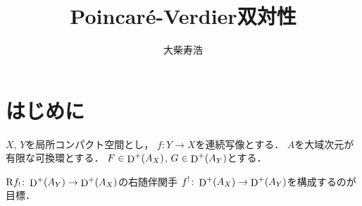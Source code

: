 \theoremstyle{mystyle}
\newtheorem{AXM}{公理}[section]
\newtheorem{DFN}[Axiom]{定義}
\newtheorem{THM}[Axiom]{定理}
\newtheorem*{THM*}{定理}
\newtheorem{PRP}[Axiom]{命題}
\newtheorem{LMM}[Axiom]{補題}
\newtheorem{CRL}[Axiom]{系}
\newtheorem{EG}[Axiom]{例}
\newtheorem{CNV}[Axiom]{規約}
\newtheorem{CMT}[Axiom]{コメント}









\def\inner<#1>{\langle #1 \rangle}








\title{Poincar\'e-Verdier双対性}
\author{大柴寿浩
}
\date{}

\maketitle
\section*{はじめに}
\(X\), \(Y\)を局所コンパクト空間とし，
\(f\colon{Y}\to{X}\)を連続写像とする．
\(A\)を大域次元が有限な可換環とする．
\(F\in\mathop{\mathrm{D}}\nolimits^+(A_X)\), \(G\in\mathop{\mathrm{D}}\nolimits^+(A_Y)\)とする．

\(\mathrm{R}f_!\colon\mathop{\mathrm{D}}\nolimits^+(A_Y)\to\mathop{\mathrm{D}}\nolimits^+(A_X)\)の右随伴関手
\(f^!\colon\mathop{\mathrm{D}}\nolimits^+(A_X)\to\mathop{\mathrm{D}}\nolimits^+(A_Y)\)を構成するのが目標．

